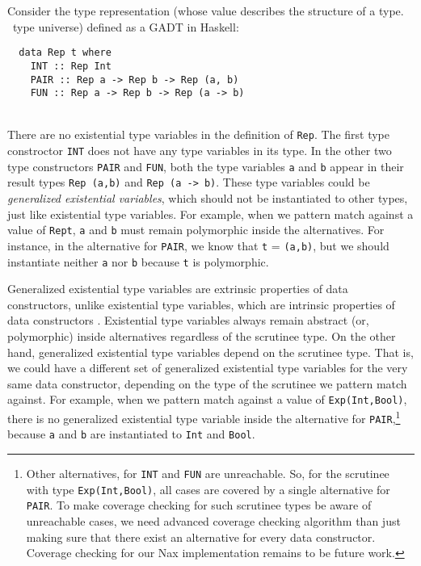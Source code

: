 Consider the type representation (whose value describes the structure of
a type. \aka\ type universe) defined as a GADT in Haskell:
\vspace*{-5ex}
\begin{singlespace}
\begin{verbatim}
  data Rep t where
    INT :: Rep Int
    PAIR :: Rep a -> Rep b -> Rep (a, b)
    FUN :: Rep a -> Rep b -> Rep (a -> b)
\end{verbatim}
\end{singlespace}
~\vspace*{-5ex}\\
There are no existential type variables in the definition of \texttt{Rep}.
The first type constroctor \texttt{INT} does not have any type variables
in its type. In the other two type constructors \texttt{PAIR} and \texttt{FUN},
both the type variables \texttt{a} and \texttt{b} appear in their result types
\texttt{\;Rep~(a,b)\;} and \texttt{\;Rep~(a -> b)\;}. These type variables
could be \emph{generalized existential variables}, which should not be
instantiated to other types, just like existential type variables.
For example, when we pattern match against a value of \texttt{\;Rep\;t},
\texttt{a} and \texttt{b} must remain polymorphic inside the alternatives.
For instance, in the alternative for \texttt{PAIR}, we know that
\texttt{t} = \texttt{(a,b)}, but we should instantiate neither \texttt{a}
nor \texttt{b} because \texttt{t} is polymorphic.

Generalized existential type variables are
extrinsic properties of data constructors, unlike existential type variables,
which are intrinsic properties of data constructors \cite{Lin10thesis}.
Existential type variables always remain abstract (or, polymorphic) inside
alternatives regardless of the scrutinee type. On the other hand,
generalized existential type variables depend on the scrutinee type. That is,
we could have a different set of generalized existential type variables
for the very same data constructor, depending on the type of the scrutinee
we pattern match against. For example, when we pattern match against
a value of \texttt{Exp\;(Int,Bool)}, there is no generalized existential
type variable inside the alternative for \texttt{PAIR},\footnote{
	Other alternatives, for \texttt{INT} and \texttt{FUN} are unreachable.
	So, for the scrutinee with type \texttt{Exp\;(Int,Bool)}, all cases
	are covered by a single alternative for \texttt{PAIR}.
	To make coverage checking for such scrutinee types be aware of
	unreachable cases, we need advanced coverage checking algorithm than
	just making sure that there exist an alternative for
	every data constructor. Coverage checking for our Nax implementation
	remains to be future work.}
because
\texttt{a} and \texttt{b} are instantiated to \texttt{Int} and \texttt{Bool}.

